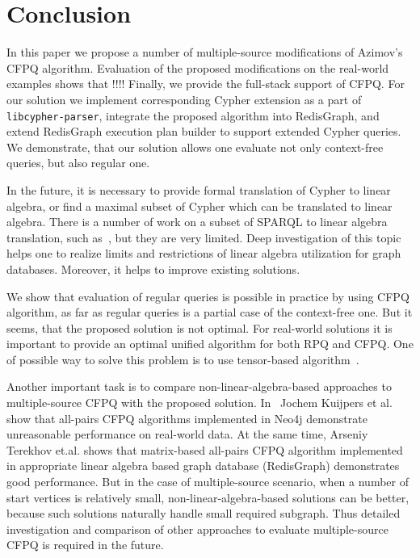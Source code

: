 \section{Conclusion}

In this paper we propose a number of multiple-source modifications of Azimov's CFPQ algorithm.
Evaluation of the proposed modifications on the real-world examples shows that !!!!
Finally, we provide the full-stack support of CFPQ.
For our solution we implement corresponding Cypher extension as a part of \texttt{libcypher-parser}, integrate the proposed algorithm into RedisGraph, and extend RedisGraph execution plan builder to support extended Cypher queries.
We demonstrate, that our solution allows one evaluate not only context-free queries, but also regular one.

In the future, it is necessary to provide formal translation of Cypher to linear algebra, or find a maximal subset of Cypher which can be translated to linear algebra.
There is a number of work on a subset of SPARQL to linear algebra translation, such as~\cite{!!!}, but they are very limited. 
Deep investigation of this topic helps one to realize limits and restrictions of linear algebra utilization for graph databases.
Moreover, it helps to improve existing solutions.

We show that evaluation of regular queries is possible in practice by using CFPQ algorithm, as far as regular queries is a partial case of the context-free one.
But it seems, that the proposed solution is not optimal. 
For real-world solutions it is important to provide an optimal unified algorithm for both RPQ and CFPQ.
One of possible way to solve this problem is to use tensor-based algorithm~\cite{10.1007/978-3-030-54832-2_6}.

Another important task is to compare non-linear-algebra-based approaches to multiple-source CFPQ with the proposed solution. 
In~\cite{Kuijpers:2019:ESC:3335783.3335791} Jochem Kuijpers et al. show that all-pairs CFPQ algorithms implemented in Neo4j demonstrate unreasonable performance on real-world data.
At the same time, Arseniy Terekhov et.al. shows that matrix-based all-pairs CFPQ algorithm implemented in appropriate linear algebra based graph database (RedisGraph) demonstrates good performance.
But in the case of multiple-source scenario, when a number of start vertices is relatively small, non-linear-algebra-based solutions can be better, because such solutions naturally handle small required subgraph.
Thus detailed investigation and comparison of other approaches to evaluate multiple-source CFPQ is required in the future.